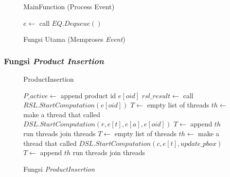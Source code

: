 \begin{figure}[H]
	\begin{algorithm}[H]
		\label{algo:main-func-event-process}
		\caption{MainFunction (Process Event)}
		\begin{algorithmic}[1]
			\Statex {}
			\Statex {} 
				\State $e \gets$ call $EQ.Dequeue()$
					\EndIf
					\EndIf
				\EndIf
			\EndWhile
		\end{algorithmic}
	\end{algorithm}
	\caption{Fungsi Utama (Memproses \textit{Event})}
\end{figure}

\subsubsection{Fungsi \textit{Product Insertion}}
\begin{figure}[H]
	\begin{algorithm}[H]
		\label{algo:product-insertion}
		\caption{ProductInsertion}
		\begin{algorithmic}[1]
			\State $P\_active \gets$ append product id $e[oid]$
			\State $rsl\_result \gets $ call $RSL.StartComputation(e[oid])$
			\State $T \gets$ empty list of threads
			 
				\State $th \gets$ make a thread that called $DSL.StartComputation(r, e[t], e[a], e[oid])$
				\State $T \gets$ append $th$
			\EndFor
			\State run threads
			\State join threads
			\State $T \gets$ empty list of threads
			 
				\State $th \gets$ make a thread that called $DSL.StartComputation(c, e[t], update\_pbox)$
				\State $T \gets$ append $th$
			\EndFor
			\State run threads
			\State join threads
	\end{algorithmic} 
\end{algorithm}
\caption{Fungsi \textit{ProductInsertion}}
\end{figure}


